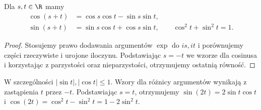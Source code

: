 \begin{twierdzenie}
\label{ma1:thm:trig-addition}
Dla $s,t\in\R$ mamy
\begin{align*}
 \cos(s+t)&=\cos s\cos t-\sin s\sin t,\\
 \sin(s+t)&=\sin s\cos t+\cos s\sin t,
 \qquad \cos^2t+\sin^2t=1.
\end{align*}
\end{twierdzenie}
\begin{proof}
Stosujemy prawo dodawania argumentów $\exp$ do $is,it$ i porównujemy części rzeczywiste i urojone iloczynu. Podstawiając $s=-t$ we wzorze dla cosinusa i korzystając z parzystości oraz nieparzystości, otrzymujemy ostatnią równość.
\end{proof}
W szczególności $|\sin t|,|\cos t|\le1$. Wzory dla różnicy argumentów wynikają z zastąpienia $t$ przez $-t$. Podstawiając $s=t$, otrzymujemy $\sin(2t)=2\sin t\cos t$ i $\cos(2t)=\cos^2t-\sin^2t=1-2\sin^2t$.

